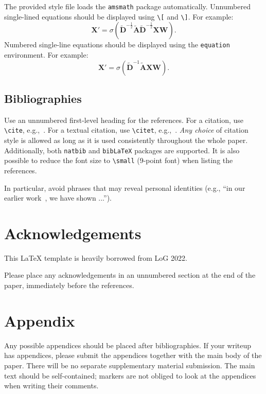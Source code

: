 \documentclass{article}
\begin{document}
The provided style file loads the \verb+amsmath+ package automatically.
Unnumbered single-lined equations should be displayed using \verb+\[+ and \verb+\]+. For example:
\[
	\mathbf{X}' = \sigma(\widetilde{\mathbf{D}}^{-\frac{1}{2}}\widetilde{\mathbf{A}}\widetilde{\mathbf{D}}^{-\frac{1}{2}} \mathbf{XW}).
\]
Numbered single-line equations should be displayed using the \verb+equation+ environment. For example:
\begin{equation}
	\mathbf{X}' = \sigma(\widetilde{\mathbf{D}}^{-1}\widetilde{\mathbf{A}}\mathbf{XW}).
\end{equation}

\subsection{Bibliographies}

Use an unnumbered first-level heading for the references.
For a citation, use \verb+\cite+, e.g.,~\cite{Kipf:2017tc}.
For a textual citation, use \verb+\citet+, e.g.,~\citet{Velickovic:2018we}.
\emph{Any choice} of citation style is allowed as long as it is used consistently throughout the whole paper.
Additionally, both \verb+natbib+ and \verb+bibLaTeX+ packages are supported.
It is also possible to reduce the font size to \verb+\small+ (9-point font) when listing the references.

In particular, avoid phrases that may reveal personal identities (e.g., ``in our earlier work~\cite{Hamilton:2017tp}, we have shown ...'').

\section*{Acknowledgements}

This \LaTeX{} template is heavily borrowed from LoG 2022.

Please place any acknowledgements in an unnumbered section at the end of the paper, immediately before the references.




\appendix
\section{Appendix}
Any possible appendices should be placed after bibliographies.
If your writeup has appendices, please submit the appendices together with the main body of the paper.
There will be no separate supplementary material submission.
The main text should be self-contained; markers are not obliged to look at the appendices when writing their comments.
\end{document}
